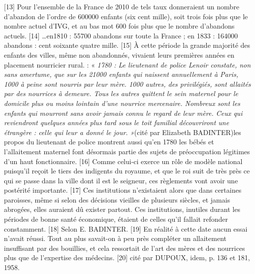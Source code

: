 [13] Pour l'ensemble de la France de 2010 de tels taux donneraient un nombre d'abandon de l'ordre de 600000 enfants (six cent mille), soit trois fois plus que le nombre actuel d'IVG, et au bas mot 600 fois plus que le nombre d'abandons actuels.
[14] …en1810 : 55700 abandons sur toute la France ; en 1833 : 164000 abandons : cent soixante quatre mille.
[15] À cette période la grande majorité des enfants des villes, même non abandonnés, vivaient leurs premières années en placement nourricier rural. : « \emph{ 1780 : Le lieutenant de police Lenoir constate, non sans amertume, que sur les 21000 enfants qui naissent annuellement à Paris, 1000 à peine sont nourris par leur mère. 1000 autres, des privilégiés, sont allaités par des nourrices à demeure. Tous les autres quittent le sein maternel pour le domicile plus ou moins lointain d'une nourrice mercenaire. Nombreux sont les enfants qui mourront sans avoir jamais connu le regard de leur mère. Ceux qui reviendront quelques années plus tard sous le toit familial découvriront une étrangère : celle qui leur a donné le jour. »}(cité par Elizabeth BADINTER)\emph{}les propos du lieutenant de police montrent aussi qu'en 1780 les bébés et l'allaitement maternel font désormais partie des sujets de préoccupation légitimes d'un haut fonctionnaire.
[16] Comme celui-ci exerce un rôle de modèle national puisqu'il reçoit le tiers des indigents du royaume, et que le roi suit de très près ce qui se passe dans la ville dont il est le seigneur, ces règlements vont avoir une postérité importante.
[17] Ces institutions n'existaient alors que dans certaines paroisses, même si selon des décisions vieilles de plusieurs siècles, et jamais abrogées, elles auraient dû exister partout. Ces institutions, inutiles durant les périodes de bonne santé économique, étaient de celles qu'il fallait refonder constamment.
[18] Selon E. BADINTER.
[19] En réalité à cette date aucun essai n'avait réussi. Tout au plus savait-on à peu près compléter un allaitement insuffisant par des bouillies, et cela ressortait de l'art des mères et des nourrices plus que de l'expertise des médecins.
[20] cité par DUPOUX, idem, p. 136 et 181, 1958.